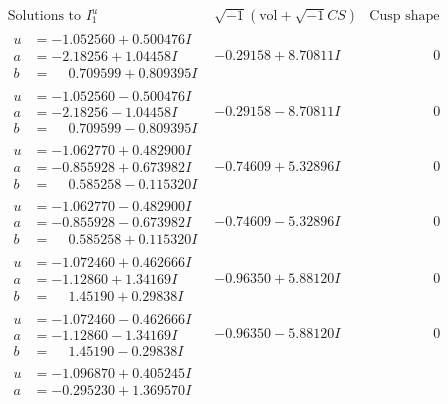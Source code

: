 \documentclass[1p]{elsarticle_modified}
\theoremstyle{definition}
\newcommand{\I}{\sqrt{-1}}
\begin{document}
$$\begin{array}{c|c|c}
\text{Solutions to }I^u_{1}& \I (\text{vol} + \sqrt{-1}CS) & \text{Cusp shape}\\
 \hline 
\begin{aligned}
u &= -1.052560 + 0.500476 I \\
a &= -2.18256 + 1.04458 I \\
b &= \phantom{-}0.709599 + 0.809395 I\end{aligned}
 & -0.29158 + 8.70811 I & \phantom{-0.000000 } 0 \\ \hline\begin{aligned}
u &= -1.052560 - 0.500476 I \\
a &= -2.18256 - 1.04458 I \\
b &= \phantom{-}0.709599 - 0.809395 I\end{aligned}
 & -0.29158 - 8.70811 I & \phantom{-0.000000 } 0 \\ \hline\begin{aligned}
u &= -1.062770 + 0.482900 I \\
a &= -0.855928 + 0.673982 I \\
b &= \phantom{-}0.585258 - 0.115320 I\end{aligned}
 & -0.74609 + 5.32896 I & \phantom{-0.000000 } 0 \\ \hline\begin{aligned}
u &= -1.062770 - 0.482900 I \\
a &= -0.855928 - 0.673982 I \\
b &= \phantom{-}0.585258 + 0.115320 I\end{aligned}
 & -0.74609 - 5.32896 I & \phantom{-0.000000 } 0 \\ \hline\begin{aligned}
u &= -1.072460 + 0.462666 I \\
a &= -1.12860 + 1.34169 I \\
b &= \phantom{-}1.45190 + 0.29838 I\end{aligned}
 & -0.96350 + 5.88120 I & \phantom{-0.000000 } 0 \\ \hline\begin{aligned}
u &= -1.072460 - 0.462666 I \\
a &= -1.12860 - 1.34169 I \\
b &= \phantom{-}1.45190 - 0.29838 I\end{aligned}
 & -0.96350 - 5.88120 I & \phantom{-0.000000 } 0 \\ \hline\begin{aligned}
u &= -1.096870 + 0.405245 I \\
a &= -0.295230 + 1.369570 I \\

\end{aligned}
\end{array}$$
\end{document}
